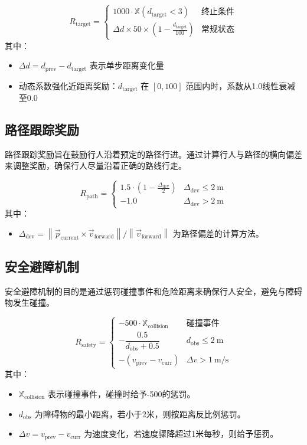 \begin{equation}
R_{\text{target}} =
\begin{cases}
1000 \cdot \mathbb{X}(d_{\text{target}}<3) & \text{终止条件} \\
\Delta d \times 50 \times \left(1 - \frac{d_{\text{target}}}{100}\right) & \text{常规状态}
\end{cases}
\end{equation}
其中：
\begin{itemize}
	\item \( \Delta d = d_{\text{prev}} - d_{\text{target}} \) 表示单步距离变化量
	\item 动态系数强化近距离奖励：\( d_{\text{target}} \) 在 \([0, 100]\) 范围内时，系数从1.0线性衰减至0.0
\end{itemize}
	
\subsection{路径跟踪奖励}
路径跟踪奖励旨在鼓励行人沿着预定的路径行进。通过计算行人与路径的横向偏差来调整奖励，确保行人尽量沿着正确的路线行走。
	
\begin{equation}
R_{\text{path}} =
\begin{cases}
1.5 \cdot \left(1 - \frac{\Delta_{\text{dev}}}{2}\right) & \Delta_{\text{dev}} \leq 2\ \text{m} \\
-1.0 & \Delta_{\text{dev}} > 2\ \text{m}
\end{cases}
\end{equation}
其中：
\begin{itemize}
	\item \( \Delta_{\text{dev}} = \left\| \vec{p}_{\text{current}} \times \vec{v}_{\text{forward}} \right\| / \left\| \vec{v}_{\text{forward}} \right\| \) 为路径偏差的计算方法。
\end{itemize}
	
\subsection{安全避障机制}
安全避障机制的目的是通过惩罚碰撞事件和危险距离来确保行人安全，避免与障碍物发生碰撞。
	
\begin{equation}
R_{\text{safety}} =
\begin{cases}
-500 \cdot \mathbb{X}_{\text{collision}} & \text{碰撞事件} \\
-\dfrac{0.5}{d_{\text{obs}} + 0.5} & d_{\text{obs}} \leq 2\ \text{m} \\
-(v_{\text{prev}} - v_{\text{curr}}) & \Delta v > 1\ \text{m/s}
\end{cases}
\end{equation}
其中：
\begin{itemize}
	\item \( \mathbb{X}_{\text{collision}} \) 表示碰撞事件，碰撞时给予-500的惩罚。
	\item \( d_{\text{obs}} \) 为障碍物的最小距离，若小于2米，则按距离反比例惩罚。
	\item \( \Delta v = v_{\text{prev}} - v_{\text{curr}} \) 为速度变化，若速度骤降超过1米每秒，则给予惩罚。
\end{itemize}
	
